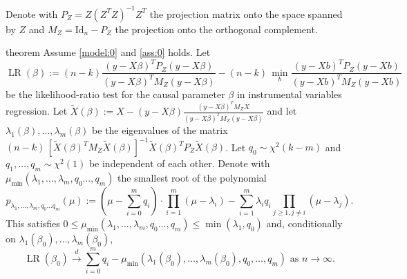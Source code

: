\documentclass[11pt,hidelinks,a4paper]{article}
\DeclareMathOperator{\LR}{LR}
\newcommand{\Id}{\mathrm{Id}}
\let\leq\leqslant
\let\geq\geqslant
\begin{document}
Denote with $P_Z = Z (Z^T Z)^{-1} Z^T$ the projection matrix onto the space spanned by $Z$ and $M_Z = \Id_n - P_Z$ the projection onto the orthogonal complement.

\begin{theoremEnd}[one big link translated={\hspace{-0.71cm} See proof on page}]{theorem}%
    \label{theorem:1}
    Assume \cref{model:0} and \cref{ass:0} holds.
    Let
    $$
    \LR(\beta) := (n - k) \frac{ (y - X \beta)^T P_Z (y - X \beta) }{ (y - X \beta)^T M_Z (y - X \beta) } - (n - k) \, \min_b  \frac{ (y - X b)^T P_Z (y - X b) }{ (y - X b)^T M_Z (y - X b) }
    $$
    be the likelihood-ratio test for the causal parameter $\beta$ in instrumental variables regression.
    Let $\tilde X(\beta) := X - (y - X \beta) \frac{ (y - X \beta)^T M_Z X }{ (y - X \beta)^T M_Z (y - X \beta) }$ and let $\lambda_1(\beta), \ldots, \lambda_m(\beta)$ be the eigenvalues of the matrix $(n - k) \, \left[ \tilde X(\beta)^T M_Z \tilde X(\beta) \right]^{-1} \tilde X(\beta)^T P_Z \tilde X(\beta)$.
    Let $q_0 \sim \chi^2(k - m)$ and $q_1, \ldots, q_m \sim \chi^2(1)$ be independent of each other.
    Denote with $\mu_\mathrm{min}(\lambda_1, \ldots, \lambda_m, q_0 \ldots, q_m)$ the smallest root of the polynomial
    $$
    p_{\lambda_1, \ldots, \lambda_m, q_0 \ldots q_m}(\mu) := \left(\mu - \sum_{i = 0}^m q_i \right) \cdot \prod_{i = 1}^m (\mu - \lambda_i) - \sum_{i = 1}^m \lambda_i q_i \prod_{j \geq 1, j\neq i} (\mu - \lambda_j).
    $$
    This satisfies $0 \leq \mu_\mathrm{min}(\lambda_1, \ldots, \lambda_m, q_0 \ldots, q_m)\leq \min(\lambda_1, q_0)$ and, conditionally on $\lambda_1(\beta_0), \ldots, \lambda_m(\beta_0)$,
    $$
    \LR(\beta_0) \overset{d}{\to} \sum_{i = 0}^m q_i - \mu_\mathrm{min}(\lambda_1(\beta_0), \ldots, \lambda_m(\beta_0), q_0, \ldots, q_m) \text{ as } n \to \infty.
    $$
\end{theoremEnd}%
\end{document}
